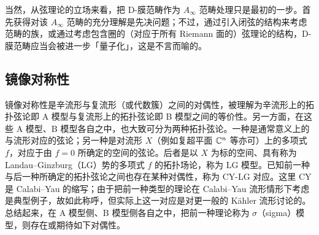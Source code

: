 当然，从弦理论的立场来看，把 D-膜范畴作为 $A_\infty$ 范畴处理只是最初的一步。首先获得对该 $A_\infty$ 范畴的充分理解是先决问题；不过，通过引入闭弦的结构来考虑范畴的族，或通过考虑包含圈的（对应于所有 Riemann 面的）弦理论的结构，D-膜范畴应当会被进一步「量子化」，这是不言而喻的。


\subsection{镜像对称性}

镜像对称性是辛流形与复流形（或代数簇）之间的对偶性，被理解为辛流形上的拓扑弦论即 A 模型与复流形上的拓扑弦论即 B 模型之间的等价性。另一方面，在这些 A 模型、B 模型各自之中，也大致可分为两种拓扑弦论。一种是通常意义上的与流形对应的弦论；另一种是对流形 $X$（例如复超平面 $\mathbb{C}^n$ 等亦可）上的多项式 $f$，对应于由 $f=0$ 所确定的空间的弦论。后者是以 $X$ 为标的空间、具有称为 Landau–Ginzburg（LG）势的多项式 $f$ 的拓扑场论，称为 LG 模型。已知前一种与后一种所确定的拓扑弦论之间也存在某种对偶性，称为 CY-LG 对应。这里 CY 是 Calabi–Yau 的缩写；由于把前一种类型的理论在 Calabi–Yau 流形情形下考虑是典型例子，故如此称呼，但实际上这一对应是对更一般的 Kähler 流形讨论的。总结起来，在 A 模型侧、B 模型侧各自之中，把前一种理论称为 $\sigma$（sigma）模型，则存在或期待如下对偶性。


\begin{center}
\end{center}

